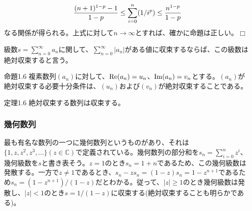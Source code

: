\documentclass[dvipdfmx, 9pt, a4paper]{jsarticle}
\def\qed{\hfill $\Box$}
\begin{document}
\begin{equation}
\frac{(n+1)^{1-p}-1}{1-p} \leq \sum_{i=0}^n(1/i^p) \leq \frac{n^{1-p}}{1-p} \notag 
\end{equation}
なる関係が得られる。上式に対して$n \to \infty$とすれば、確かに命題は正しい。\qed \par
\begin{tcolorbox}[title=絶対収束]
級数$s=\sum_{n=0}^\infty a_n$に関して、$\sum_{n=0}^\infty |a_n|$がある値に収束するならば、この級数は絶対収束すると言う。
\end{tcolorbox}
\begin{itembox}[l]{命題1.6}
複素数列$(a_n)$に対して、${\rm Re}(a_n)=u_n$、${\rm Im}(a_n)=v_n$とする。$(a_n)$が絶対収束する必要十分条件は、$(u_n)$および$(v_n)$が絶対収束することである。
\end{itembox}
\begin{itembox}[l]{定理1.6}
絶対収束する数列は収束する。
\end{itembox}

\subsubsection{幾何数列}
最も有名な数列の一つに幾何数列というものがあり、それは$\{ 1, z, z^2, z^3, ...\}(z \in \mathbb{C})$で定義されている。幾何数列の部分和を$s_n=\sum_{i=0}^nz^i$、幾何級数を$s$と書き表そう。$z=1$のとき$s_n=1+n$であるため、この幾何級数は発散する。一方で$z \neq 1$であるとき、$s_n-zs_n=(1-z)s_n=1-z^{n+1}$であるため$s_n=(1-z^{n+1})/(1-z)$だとわかる。従って、$|z| \geq 1$のとき幾何級数は発散し、$|z| < 1$のとき$s=1/(1-z)$に収束する(絶対収束することも明らかである)。
\end{document}
